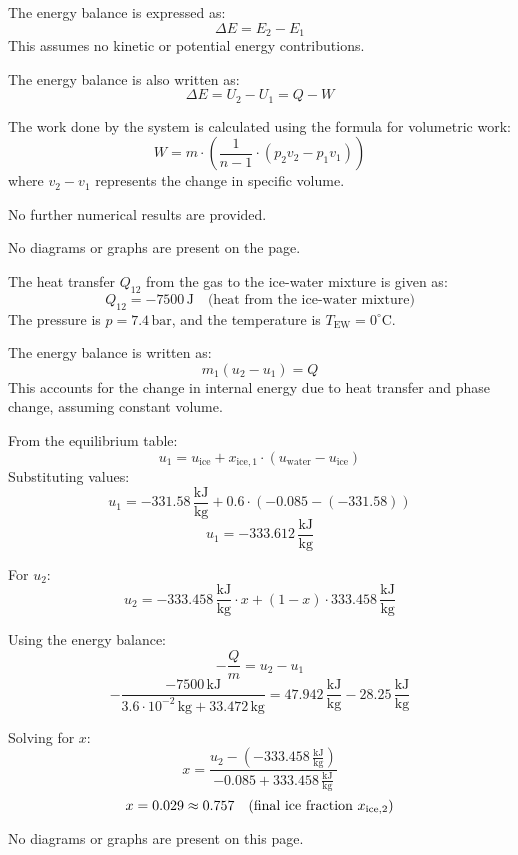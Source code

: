 The energy balance is expressed as:  
\[
\Delta E = E_2 - E_1
\]  
This assumes no kinetic or potential energy contributions.  

The energy balance is also written as:  
\[
\Delta E = U_2 - U_1 = Q - W
\]  

The work done by the system is calculated using the formula for volumetric work:  
\[
W = m \cdot \left( \frac{1}{n-1} \cdot (p_2 v_2 - p_1 v_1) \right)
\]  
where \( v_2 - v_1 \) represents the change in specific volume.  

No further numerical results are provided.  

No diagrams or graphs are present on the page.

The heat transfer \( Q_{12} \) from the gas to the ice-water mixture is given as:  
\[
Q_{12} = -7500 \, \text{J} \quad \text{(heat from the ice-water mixture)}  
\]  
The pressure is \( p = 7.4 \, \text{bar} \), and the temperature is \( T_{\text{EW}} = 0^\circ\text{C} \).  

The energy balance is written as:  
\[
m_1 (u_2 - u_1) = Q  
\]  
This accounts for the change in internal energy due to heat transfer and phase change, assuming constant volume.  

From the equilibrium table:  
\[
u_1 = u_{\text{ice}} + x_{\text{ice},1} \cdot (u_{\text{water}} - u_{\text{ice}})  
\]  
Substituting values:  
\[
u_1 = -331.58 \, \frac{\text{kJ}}{\text{kg}} + 0.6 \cdot (-0.085 - (-331.58))  
\]  
\[
u_1 = -333.612 \, \frac{\text{kJ}}{\text{kg}}  
\]  

For \( u_2 \):  
\[
u_2 = -333.458 \, \frac{\text{kJ}}{\text{kg}} \cdot x + (1 - x) \cdot 333.458 \, \frac{\text{kJ}}{\text{kg}}  
\]  

Using the energy balance:  
\[
-\frac{Q}{m} = u_2 - u_1  
\]  
\[
-\frac{-7500 \, \text{kJ}}{3.6 \cdot 10^{-2} \, \text{kg} + 33.472 \, \text{kg}} = 47.942 \, \frac{\text{kJ}}{\text{kg}} - 28.25 \, \frac{\text{kJ}}{\text{kg}}  
\]  

Solving for \( x \):  
\[
x = \frac{u_2 - (-333.458 \, \frac{\text{kJ}}{\text{kg}})}{-0.085 + 333.458 \, \frac{\text{kJ}}{\text{kg}}}  
\]  
\[
x = 0.029 \approx 0.757 \quad \text{(final ice fraction \( x_{\text{ice},2} \))}  
\]  

No diagrams or graphs are present on this page.